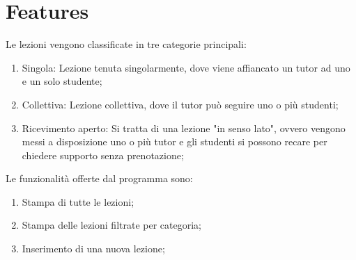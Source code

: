 \section{Features}
Le lezioni vengono classificate in tre categorie principali:
\begin{enumerate}
	\item Singola: Lezione tenuta singolarmente, dove viene affiancato un tutor ad uno e un solo studente;
	\item Collettiva: Lezione collettiva, dove il tutor può seguire uno o più studenti;
	\item Ricevimento aperto: Si tratta di una lezione "in senso lato", ovvero vengono messi a disposizione uno o più tutor e gli studenti si possono recare per chiedere supporto senza prenotazione;
\end{enumerate}
Le funzionalità offerte dal programma sono:
\begin{enumerate}
	\item Stampa di tutte le lezioni;
	\item Stampa delle lezioni filtrate per categoria;
	\item Inserimento di una nuova lezione;
\end{enumerate}

